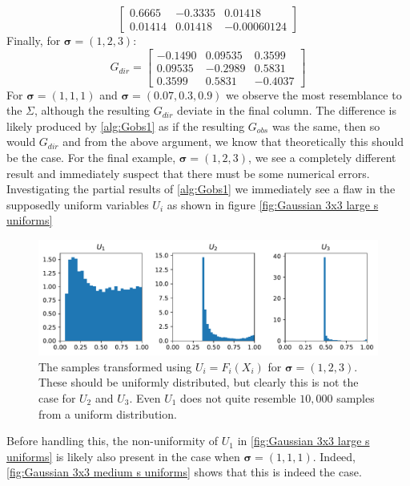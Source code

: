 \documentclass[../Thesis.tex]{subfiles}
\begin{document}
\begin{example}
\begin{equation}
\begin{bmatrix}
            0.6665  & -0.3335 & 0.01418     \\
            0.01414 & 0.01418 & -0.00060124
        \end{bmatrix}
    \end{equation}
    Finally, for $\boldsymbol\sigma = (1,2,3)$:
    $$ G_{dir} =
        \begin{bmatrix}
            -0.1490 & 0.09535 & 0.3599  \\
            0.09535 & -0.2989 & 0.5831  \\
            0.3599  & 0.5831  & -0.4037
        \end{bmatrix}
    $$
    For $\boldsymbol\sigma = (1,1,1)$ and $\boldsymbol\sigma = (0.07, 0.3, 0.9)$ we observe the most resemblance to the $\Sigma$, although the resulting $G_{dir}$ deviate in the final column. The difference is likely produced by \autoref{alg:Gobs1} as if the resulting $G_{obs}$ was the same, then so would $G_{dir}$ and from the above argument, we know that theoretically this should be the case. For the final example, $\boldsymbol\sigma = (1,2,3)$, we see a completely different result and immediately suspect that there must be some numerical errors. Investigating the partial results of \autoref{alg:Gobs1} we immediately see a flaw in the supposedly uniform variables $U_i$ as shown in figure \autoref{fig:Gaussian 3x3 large s uniforms}
    \begin{figure}[H]
        \centering
        \includegraphics[width=0.99\linewidth]{figures/ND examples/Gaussian 3x3 large s uniforms.pdf}
        \caption{The samples transformed using $U_i = F_i(X_i)$ for $\boldsymbol\sigma = (1,2,3)$. These should be uniformly distributed, but clearly this is not the case for $U_2$ and $U_3$. Even $U_1$ does not quite resemble $10{,}000$ samples from a uniform distribution.}
        \label{fig:Gaussian 3x3 large s uniforms}
    \end{figure}
    Before handling this, the non-uniformity of $U_1$ in \autoref{fig:Gaussian 3x3 large s uniforms} is likely also present in the case when $\boldsymbol\sigma = (1,1,1)$. Indeed, \autoref{fig:Gaussian 3x3 medium s uniforms} shows that this is indeed the case.

\end{example}
\end{document}
